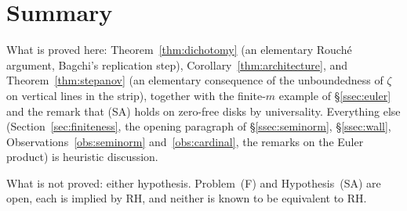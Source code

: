 \documentclass[11pt]{amsart}
\theoremstyle{definition}
\theoremstyle{remark}
\begin{document}
\section{Summary}\label{sec:assessment}

What is proved here: Theorem~\ref{thm:dichotomy} (an elementary Rouch\'e
argument, Bagchi's replication step), Corollary~\ref{thm:architecture}, and
Theorem~\ref{thm:stepanov} (an elementary consequence of the unboundedness of
$\zeta$ on vertical lines in the strip), together with the finite-$m$
example of \S\ref{ssec:euler} and the remark that (SA) holds on zero-free disks by
universality. Everything else (Section~\ref{sec:finiteness}, the opening
paragraph of \S\ref{ssec:seminorm}, \S\ref{ssec:wall},
Observations~\ref{obs:seminorm} and~\ref{obs:cardinal}, the remarks on the
Euler product) is heuristic discussion.

What is not proved: either hypothesis. Problem~(F) and Hypothesis~(SA) are
open, each is implied by RH, and neither is known to be equivalent to RH.
\end{document}
